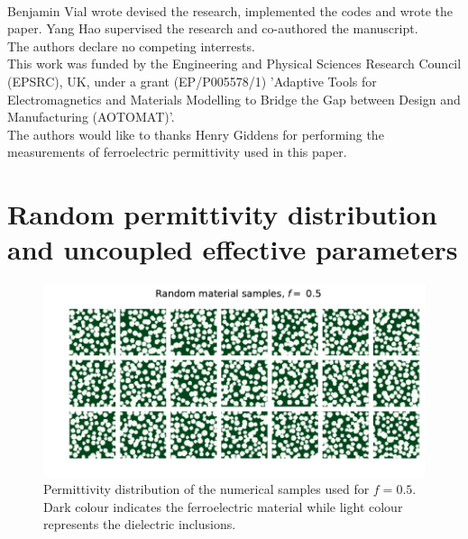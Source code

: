 \documentclass[aps,prb,11pt]{revtex4-1}
\begin{document}
\vskip6pt


\\
{Benjamin Vial wrote devised the research, implemented
the codes and wrote the paper. Yang Hao supervised the research and
co-authored the manuscript.}\\
{The authors declare no competing interrests.}\\
{This work was funded by the Engineering and Physical Sciences Research
Council (EPSRC), UK, under a grant (EP/P005578/1) 'Adaptive Tools for
Electromagnetics and Materials Modelling to Bridge the Gap between
Design and Manufacturing (AOTOMAT)'.}\\
{The authors would like to thanks Henry Giddens for performing the
measurements of ferroelectric permittivity used in this paper.}\\


\appendix

\section{Random permittivity distribution and uncoupled effective parameters}

\begin{figure}[h!]
 \centering
 \includegraphics[width=0.7\columnwidth]{random_samples_f_50percent}
 \caption{Permittivity distribution of the numerical samples used for $f=0.5$. Dark
  colour indicates the ferroelectric material while light colour represents the
  dielectric inclusions.}
 \label{randmatepsi}
\end{figure}
\end{document}
